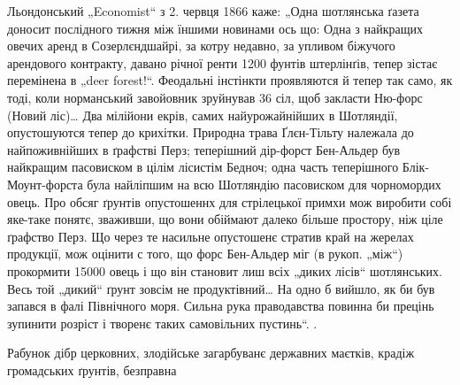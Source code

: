 {Льондонський „Economist“ з 2. червця 1866 каже: „Одна шотлянська ґазета доносит послідного тижня між
їншими новинами ось що: Одна з найкращих овечих аренд в Созерлєндшайрі, за котру недавно, за упливом
біжучого арендового контракту, давано річної ренти 1200 фунтів штерлінґів, тепер зістає перемінена в
„deer forest!“. Феодальні інстінкти проявляются й тепер так само, як тоді, коли норманський
завойовник зруйнував 36 сіл, щоб закласти Ню-форс (Новий ліс)\dots{} Два мілійони екрів, самих
найурожайнійших в Шотляндії, опустошуются тепер до крихітки. Природна трава Ґлєн-Тільту належала до
найпоживнійших в ґрафстві Перз; теперішний дір-форст Бен-Альдер був найкращим пасовиском в цілім
лісистім Бедноч; одна часть теперішного Блік-Моунт-форста була найліпшим на всю Шотляндію пасовиском
для чорномордих овець. Про обсяг ґрунтів опустошеннх для стрілецької примхи мож виробити собі
яке-таке понятє, зваживши, що вони обіймают далеко більше простору, ніж ціле ґрафство Перз. Що через
те насильне опустошенє стратив край на жерелах продукції, мож оцінити с того, що форс Бен-Альдер міг
(в рукоп. „між“) прокормити 15000 овець і що він становит лиш  всіх „диких лісів“ шотлянських.
Весь той „дикий“ ґрунт зовсім не продуктівний\dots{} На одно б вийшло, як би був запався в фалі
Північного моря. Сильна рука праводавства повинна би прецінь зупинити розріст і творенє таких
самовільних пустинь“.
}.

Рабунок дібр церковних, злодійське загарбуванє державних маєтків, крадіж громадських ґрунтів,
безправна \parbreak{}
